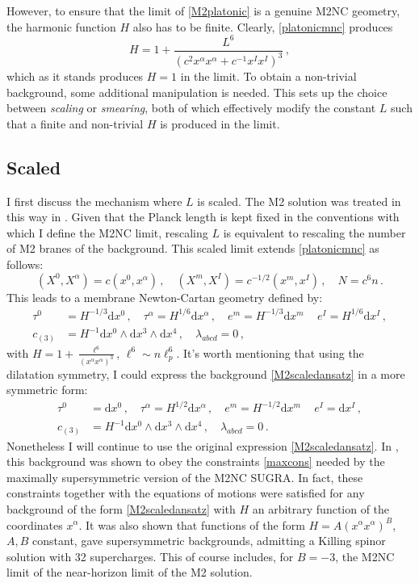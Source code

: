 \documentclass[11pt]{article}
\newcommand{\be}{\begin{equation}}
\newcommand{\ee}{\end{equation}}
\newcommand{\dd}{\mathrm{d}}
\numberwithin{equation}{section}
\begin{document}
{{However, to ensure that the limit of \eqref{M2platonic} is a genuine M2NC geometry, the harmonic function $H$ also has to be finite.
Clearly, \eqref{platonicmnc} produces
\be
\label{Hplatonic}
H = 1 + \frac{L^6}{( c^2 x^\alpha x^\alpha + c^{-1} x^I x^I)^3} \,,
\ee
which as it stands produces $H=1$ in the limit. 
To obtain a non-trivial background, some additional manipulation is needed.
This sets up the choice \cite{Blair:2024aqz, Lambert:2024ncn} between \emph{scaling} or \emph{smearing}, both of which effectively modify the constant $L$ such that a finite and non-trivial $H$ is produced in the limit.

\subsection{Scaled}
\label{sec:M2scaled} 

I first discuss the mechanism where $L$ is scaled.
The M2 solution was treated in this way in \cite{Lambert:2024uue}.
Given that the Planck length is kept fixed in the conventions with which I define the M2NC limit, rescaling $L$ is equivalent to rescaling the number of M2 branes of the background.
This scaled limit extends \eqref{platonicmnc} as follows:
\be
(X^0, X^\alpha) = c ( x^0, x^\alpha) \,,\quad
(X^m, X^I) = c^{-1/2} (x^m, x^I) \,,\quad
N = c^6 n \,.
\ee
This leads to a membrane Newton-Cartan geometry defined by:
\be
\label{M2scaledansatz} 
\begin{split} 
\tau^0 & = H^{-1/3} \dd x^0 \,,\quad
\tau^\alpha  = H^{1/6} \dd x^\alpha \,,\quad
e^m = H^{-1/3} \dd x^m \,\quad
e^I = H^{1/6} \dd x^I \,,\\[4pt]
c_{(3)} & = H^{-1} \dd x^0 \wedge \dd x^3 \wedge \dd x^4 \,,\quad \lambda_{abcd}=0\,,
\end{split}
\ee
with $H= 1 + \frac{\ell^6}{(x^\alpha x^\alpha)^3}$, $\ell^6 \sim n \ell_p^6$.
It's worth mentioning that using the dilatation symmetry, I could express the background \eqref{M2scaledansatz} in a more symmetric form:
\be
\begin{split} 
\tau^0 & = \dd x^0 \,,\quad
\tau^\alpha  = H^{1/2} \dd x^\alpha \,,\quad
e^m = H^{-1/2} \dd x^m \,\quad
e^I = \dd x^I \,,\\[4pt]
c_{(3)} & = H^{-1} \dd x^0 \wedge \dd x^3 \wedge \dd x^4 \,,\quad \lambda_{abcd} = 0 \,.
\end{split}
\label{myansatzdil}
\ee
Nonetheless I will continue to use the original expression \eqref{M2scaledansatz}.
In \cite{Bergshoeff:2024nin}, this background was shown to obey the constraints \eqref{maxcons} needed by the maximally supersymmetric version of the M2NC SUGRA.
In fact, these constraints together with the equations of motions were satisfied for any background of the form \eqref{M2scaledansatz} with $H$ an arbitrary function of the coordinates $x^\alpha$.
It was also shown that functions of the form $H = A (x^\alpha x^\alpha)^B$, $A,B$ constant, gave supersymmetric backgrounds, admitting a Killing spinor solution with 32 supercharges. This of course includes, for $B=-3$, the M2NC limit of the near-horizon limit of the M2 solution.

}}
\end{document}
